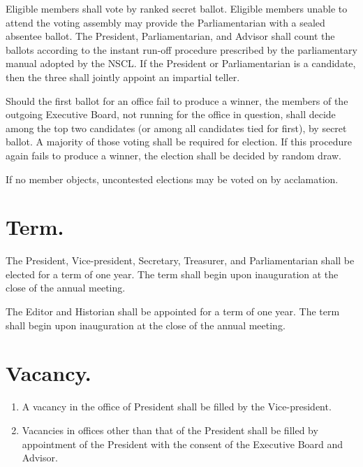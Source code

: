 \documentclass{bylaws}
\newcommand{\NSCL}{\textsc{NSCL}\xspace}
\begin{document}
\begin{linenumbers}[1]
\begin{enumerate}
    \sub[Voting] Eligible members shall vote by ranked secret
    ballot. Eligible members unable to attend the voting assembly may
    provide the Parliamentarian with a sealed absentee ballot. The
    President, Parliamentarian, and Advisor shall count the ballots
    according to the instant run-off procedure prescribed by the
    parliamentary manual adopted by the \NSCL. If the President or
    Parliamentarian is a candidate, then the three shall jointly appoint
    an impartial teller.
    
    \sub[No Election] Should the first ballot for an office fail to
    produce a winner, the members of the outgoing Executive Board, not
    running for the office in question, shall decide among the top two
    candidates (or among all candidates tied for first), by secret
    ballot. A majority of those voting shall be required for
    election. If this procedure again fails to produce a winner, the
    election shall be decided by random draw.
    
     If no member objects, uncontested
    elections may be voted on by acclamation.\\
  \end{enumerate}

  \section{Term.}
  \begin{enumerate}
     The President, Vice-president, Secretary,
    Treasurer, and Parliamentarian shall be elected for a term of one
    year. The term shall begin upon inauguration at the close of the
    annual meeting.
    
     The Editor and Historian shall be
    appointed for a term of one year. The term shall begin upon
    inauguration at the close of the annual meeting.\\
  \end{enumerate}

  \section{Vacancy.}
  \begin{enumerate}
  \item A vacancy in the office of President shall be filled by the
    Vice-president.
  \item Vacancies in offices other than that of the President shall be
    filled by appointment of the President with the consent of the
    Executive Board and Advisor.\\
  \end{enumerate}


\end{linenumbers}
\end{document}
